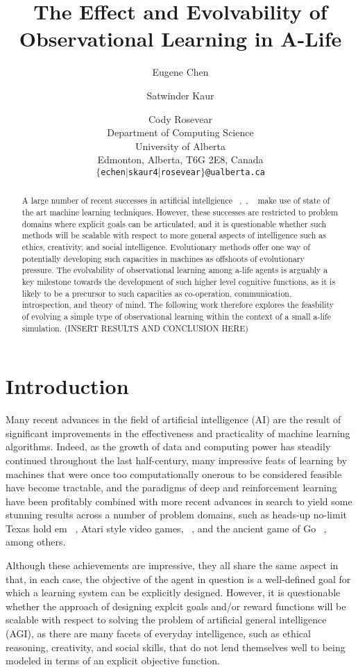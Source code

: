 \documentclass[letterpaper]{article}
\title{The Effect and Evolvability of Observational Learning in A-Life}
\author{Eugene Chen \and Satwinder Kaur \and Cody Rosevear\\
Department of Computing Science \\ University of Alberta \\
Edmonton, Alberta, T6G 2E8, Canada \\
{\tt $\{$echen$\mid$skaur4$\mid$rosevear$\}$@ualberta.ca}}
\numberwithin{equation}{section}
\numberwithin{theorem}{section}
\numberwithin{lemma}{section}
\numberwithin{df}{section}
\begin{document}
\maketitle

\begin{abstract}
A large number of recent successes in artificial intellgience ~\cite{moravvcik2017deepstack},~\cite{mnih2013playing}, ~\cite{silver2017mastering} make use of state of the art machine learning techniques. However, these successes are restricted to problem domains where explicit goals can be articulated, and it is questionable whether such methods will be scalable with respect to more general aspects of intelligence such as ethics, creativity, and social intelligence. Evolutionary methods offer one way of potentially developing such capacities in machines as offshoots of evolutionary pressure. The evolvability of observational learning among a-life agents is arguably a key milestone towards the development of such higher level cognitive functions, as it is likely to be a precursor to such capacities as co-operation, communication, introspection, and theory of mind. The following work therefore explores the feasbility of evolving a simple type of observational learning within the context of a small a-life simulation. (INSERT RESULTS AND CONCLUSION HERE)
\end{abstract}

\section{Introduction}

Many recent advances in the field of artificial intelligence (AI) are the result of significant improvements in the effectiveness and practicality of machine learning algorithms. Indeed, as the growth of data and computing power has steadily continued throughout the last half-century, many impressive feats of learning by machines that were once too computationally onerous to be considered feasible have become tractable, and the paradigms of deep and reinforcement learning have been profitably combined with more recent advances in search \cite{chaslot2008monte} to yield some stunning results across a number of problem domains, such as heads-up no-limit Texas hold em ~\cite{moravvcik2017deepstack}, Atari style video games, ~\cite{mnih2013playing}, and the ancient game of Go ~\cite{silver2017mastering}, among others.

Although these achievements are impressive, they all share the same aspect in that, in each case, the objective of the agent in question is a well-defined goal for which a learning system can be explicitly designed. However, it is questionable whether the approach of designing explcit goals and/or reward functions will be scalable with respect to solving the problem of artificial general intelligence (AGI), as there are many facets of everyday intelligence, such as ethical reasoning, creativity, and social skills, that do not lend themselves well to being modeled in terms of an explicit objective function.
\end{document}
